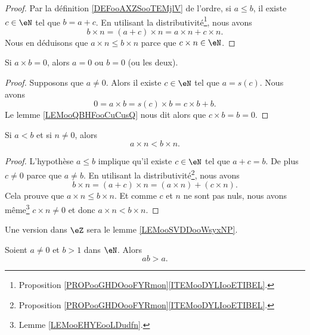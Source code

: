 \begin{proof}
    Par la définition \ref{DEFooAXZSooTEMjlV} de l'ordre, si \( a\leq b\), il existe \( c\in \eN\) tel que \( b=a+c\). En utilisant la distributivité\footnote{Proposition \ref{PROPooGHDOooFYRmon}\ref{ITEMooDYLIooETIBEL}.}, nous avons
    \begin{equation}
        b\times n=(a+c)\times n=a\times n+c\times n. 
    \end{equation}
    Nous en déduisons que \( a\times n\leq b\times n\) parce que \( c\times n \in \eN\).
\end{proof}

\begin{lemma}       \label{LEMooEHYEooLDudfn}
    Si \( a\times b=0\), alors \( a=0\) ou \( b=0\) (ou les deux).
\end{lemma}

\begin{proof}
    Supposons que \( a\neq 0\). Alors il existe \( c\in \eN\) tel que \( a=s(c)\). Nous avons
    \begin{equation}
        0=a\times b=s(c)\times b=c\times b+b.
    \end{equation}
    Le lemme \ref{LEMooQBHFooCuCusQ} nous dit alors que \( c\times b=b=0\).
\end{proof}

\begin{lemma}        \label{LEMooGUXGooBcKJdS}
    Si \( a< b\)  et si \( n\neq 0\), alors
    \begin{equation}
        a\times n<b\times n.
    \end{equation}
\end{lemma}

\begin{proof}
    L'hypothèse \( a\leq b\) implique qu'il existe \( c\in \eN\) tel que \( a+c=b\). De plus \( c\neq 0\) parce que \( a\neq b\). En utilisant la distributivité\footnote{Proposition \ref{PROPooGHDOooFYRmon}\ref{ITEMooDYLIooETIBEL}.}, nous avons
    \begin{equation}
        b\times n=(a+c)\times n=(a\times n)+(c\times n).
    \end{equation}
    Cela prouve que \( a\times n\leq b\times n\). Et comme \( c\) et \( n\) ne sont pas nuls, nous avons même\footnote{Lemme \ref{LEMooEHYEooLDudfn}.} \( c\times n\neq 0\) et donc \( a\times n<b\times n\).
\end{proof}

Une version dans \( \eZ\) sera le lemme \ref{LEMooSVDDooWsyxNP}.
\begin{lemma}        \label{LEMooSFUKooBNAple}
    Soient \( a\neq 0\) et \( b>1\) dans \( \eN\). Alors
    \begin{equation}
        ab>a.
    \end{equation}
\end{lemma}

